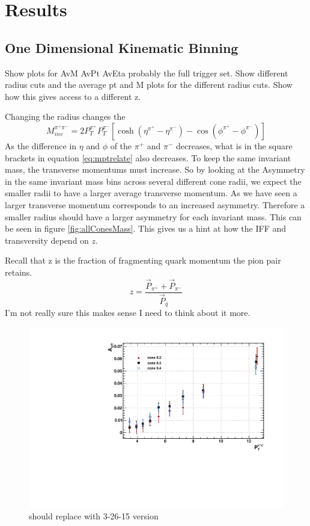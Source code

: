 \documentclass[abstract = on,listof=totoc, bibliography=totoc]{scrreprt}
\newcommand{\ptpair}{P_{T}^{\pi^+\pi^-}}
\newcommand{\mpair}{M_{inv}^{\pi^+\pi^-}}
\newcommand{\pip}{\pi^+}
\newcommand{\pim}{\pi^-}
\begin{document}
\chapter{Results}

\section{One Dimensional Kinematic Binning}
Show plots for AvM AvPt AvEta probably the full trigger set. Show different radius cuts and the average pt and M plots for the different radius cuts. Show how this gives access to a different z.

Changing the radius changes the 
\begin{equation}
\label{eq:mptrelate}
\mpair = 2P_T^{\pi^+}P_T^{\pi^-}\left[\cosh \left(\eta^{\pi^+}-\eta^{\pi^-}\right) - \cos \left(\phi^{\pi^+}-\phi^{\pi^-}\right)\right]
\end{equation}
%
As the difference in $\eta$ and $\phi$ of the $\pip$ and $\pim$ decreases, what is in the square brackets in equation \ref{eq:mptrelate} also decreases. To keep the same invariant mass, the transverse momentums must increase. So by looking at the Asymmetry in the same invariant mass bins across several different cone radii, we expect the smaller radii to have a larger average transverse momentum. As we have seen a larger transverse momentum corresponds to an increased asymmetry. Therefore a smaller radius should have a larger asymmetry for each invariant mass. This can be seen in figure \ref{fig:allConesMass}. This gives us a hint at how the IFF and transversity depend on $z$. 

Recall that z is the fraction of fragmenting quark momentum the pion pair retains.
\begin{equation}
\label{eq:mptrelate}
z = \frac{\vec{P}_{\pip} + \vec{P}_{\pim}}{\vec{P}_q}
\end{equation}
%
I'm not really sure this makes sense I need to think about it more.

\begin{figure}
\begin{center}
\includegraphics[width = .7\textwidth]{allConesPt}
\caption[Asymmetry vs $\ptpair$ for different cone radii]{should replace with 3-26-15 version}
\label{fig:allConesPt $\eta > 0$}
\end{center}
\end{figure}
\end{document}
